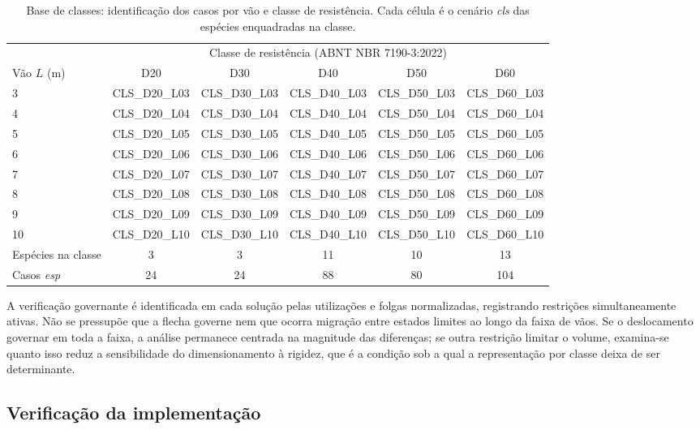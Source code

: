 \begin{table}[!ht]
\centering
\caption{Base de classes: identificação dos casos por vão e classe de resistência. Cada célula é o cenário \emph{cls} das espécies enquadradas na classe.}
\label{tab:matriz_classes}
\scriptsize
\setlength{\tabcolsep}{4pt}
\begin{tabular}{lccccc}
\toprule
 & \multicolumn{5}{c}{Classe de resistência (ABNT NBR 7190-3:2022)} \\
\cmidrule{2-6}
Vão $L$ (m) & D20 & D30 & D40 & D50 & D60 \\
\midrule
3  & CLS\_D20\_L03 & CLS\_D30\_L03 & CLS\_D40\_L03 & CLS\_D50\_L03 & CLS\_D60\_L03 \\
4  & CLS\_D20\_L04 & CLS\_D30\_L04 & CLS\_D40\_L04 & CLS\_D50\_L04 & CLS\_D60\_L04 \\
5  & CLS\_D20\_L05 & CLS\_D30\_L05 & CLS\_D40\_L05 & CLS\_D50\_L05 & CLS\_D60\_L05 \\
6  & CLS\_D20\_L06 & CLS\_D30\_L06 & CLS\_D40\_L06 & CLS\_D50\_L06 & CLS\_D60\_L06 \\
7  & CLS\_D20\_L07 & CLS\_D30\_L07 & CLS\_D40\_L07 & CLS\_D50\_L07 & CLS\_D60\_L07 \\
8  & CLS\_D20\_L08 & CLS\_D30\_L08 & CLS\_D40\_L08 & CLS\_D50\_L08 & CLS\_D60\_L08 \\
9  & CLS\_D20\_L09 & CLS\_D30\_L09 & CLS\_D40\_L09 & CLS\_D50\_L09 & CLS\_D60\_L09 \\
10 & CLS\_D20\_L10 & CLS\_D30\_L10 & CLS\_D40\_L10 & CLS\_D50\_L10 & CLS\_D60\_L10 \\
\midrule
Espécies na classe & 3 & 3 & 11 & 10 & 13 \\
Casos \emph{esp} & 24 & 24 & 88 & 80 & 104 \\
\bottomrule
\end{tabular}
\end{table}

A verificação governante é identificada em cada solução pelas utilizações e folgas normalizadas, registrando restrições simultaneamente ativas. Não se pressupõe que a flecha governe nem que ocorra migração entre estados limites ao longo da faixa de vãos. Se o deslocamento governar em toda a faixa, a análise permanece centrada na magnitude das diferenças; se outra restrição limitar o volume, examina-se quanto isso reduz a sensibilidade do dimensionamento à rigidez, que é a condição sob a qual a representação por classe deixa de ser determinante.

\subsection{Verificação da implementação}\label{sec:verificacao}

